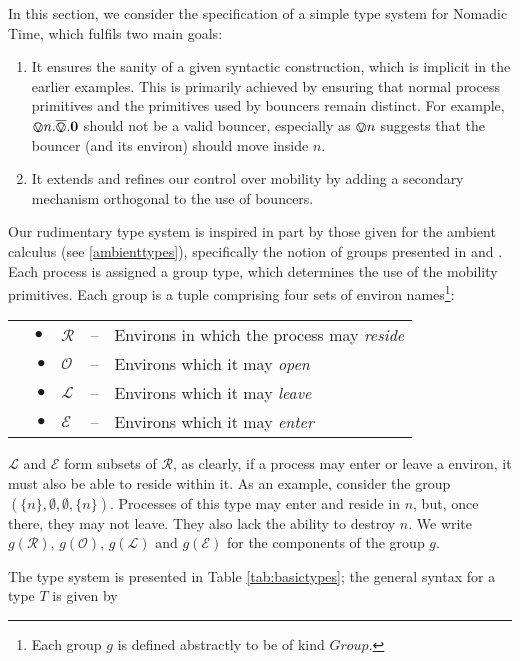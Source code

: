 In this section, we consider the specification of a simple type
system for Nomadic Time, which fulfils two main goals:

\begin{enumerate}
\item It ensures the sanity of a given syntactic construction, which
  is implicit in the earlier examples.  This is primarily achieved by
  ensuring that normal process primitives and the primitives used by
  bouncers remain distinct.  For example, $\varovee n.\overline{\varovee}.\textbf{0}$ should
  not be a valid bouncer, especially as $\varovee n$ suggests that the
  bouncer (and its environ) should move inside $n$.
\item It extends and refines our control over mobility by adding a
      secondary mechanism orthogonal to the use of bouncers.
\end{enumerate}

Our rudimentary type system is inspired in part by those given for the
ambient calculus (see \ref{ambienttypes}), specifically the notion of
groups presented in \cite{ambienttypes} and \cite{m3}.  Each process is
assigned a group type, which determines the use of the mobility
primitives.  Each group is a tuple comprising four sets of environ
names\footnote{Each group $g$ is defined abstractly to be of kind
$Group$.}:

\begin{tabular}{rlcl}
$\quad \bullet$ & $\mathscr{R}$ & -- & Environs in which the process may
 \emph{reside} \\
$\bullet$ & $\mathscr{O}$ & -- & Environs which it may \emph{open} \\
$\bullet$ & $\mathscr{L}$ & -- & Environs which it may \emph{leave} \\
$\bullet$ & $\mathscr{E}$ & -- & Environs which it may \emph{enter}
\end{tabular}

$\mathscr{L}$ and $\mathscr{E}$ form subsets of $\mathscr{R}$, as
clearly, if a process may enter or leave a environ, it must also be able
to reside within it.  As an example, consider the group
$(\{n\},\emptyset, \emptyset,\{n\})$.  Processes of this type may enter
and reside in $n$, but, once there, they may not leave.  They also lack
the ability to destroy $n$.  We write $g(\mathscr{R})$,
$g(\mathscr{O})$, $g(\mathscr{L})$ and $g(\mathscr{E})$ for the
components of the group $g$.

The type system is presented in Table \ref{tab:basictypes}; the general
syntax for a type $T$ is given by

